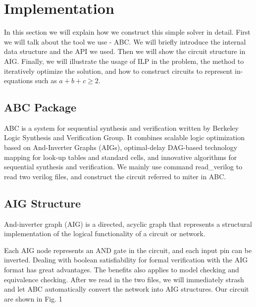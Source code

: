 \section{Implementation}
In this section we will explain how we construct this simple solver in detail. First we will talk about the tool we use - ABC. We will briefly introduce the internal data structure and the API we used. Then we will show the circuit structure in AIG. Finally, we will illustrate the usage of ILP in the problem, the method to iteratively optimize the solution, and how to construct circuits to represent in-equations such as $a+b+c \geq 2$.
\subsection{ABC Package}
ABC is a system for sequential synthesis and verification written by Berkeley Logic Synthesis and Verification Group. It combines scalable logic optimization based on And-Inverter Graphs (AIGs), optimal-delay DAG-based technology mapping for look-up tables and standard cells, and innovative algorithms for sequential synthesis and verification.
We mainly use command read\_verilog to read two verilog files, and construct the circuit referred to miter in ABC.

\subsection{AIG Structure}
And-inverter graph (AIG) is a directed, acyclic graph that represents a structural implementation of the logical functionality of a circuit or network.

Each AIG node represents an AND gate in the circuit, and each input pin can be inverted. Dealing with boolean satisfiability for formal verification with the AIG format has great advantages. The benefits also applies to model checking and equivalence checking.
After we read in the two files, we will immediately strash and let ABC automatically convert the network into AIG structures. Our circuit are shown in Fig. 1
    
